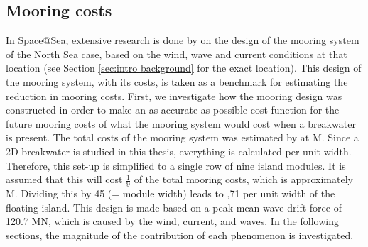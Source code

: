 \subsection{Mooring costs}
\label{sec: mooring costs}




In Space@Sea, extensive research is done by \citet{D3.3space@sea} on the design of the mooring system of the North Sea case, based on the wind, wave and current conditions at that location (see Section \ref{sec:intro background} for the exact location). This design of the mooring system, with its costs, is taken as a benchmark for estimating the reduction in mooring costs. First, we investigate how the mooring design was constructed in order to make an as accurate as possible cost function for the future mooring costs of what the mooring system would cost when a breakwater is present. The total costs of the mooring system was estimated by \citet{D3.3space@sea} at  M. Since a 2D breakwater is studied in this thesis, everything is calculated per unit width. Therefore, this set-up is simplified to a single row of nine island modules. It is assumed that this will cost $\frac{1}{9}$ of the total mooring costs, which is approximately  M. Dividing this by 45 (= module width) leads to ,71 per unit width of the floating island.  This design is made based on a peak mean wave drift force of 120.7 MN, which is caused by the wind, current, and waves. In the following sections, the magnitude of the contribution of each phenomenon is investigated. 


